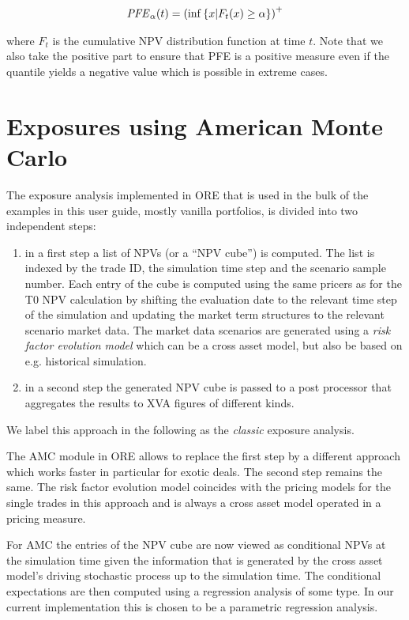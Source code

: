 \begin{align}
  \mathit{PFE}_\alpha(t) = \left(\inf\left\{ x | F_t(x) \geq \alpha\right\}\right)^+ \label{PFE}
\end{align}

where $F_t$ is the cumulative NPV distribution function at time $t$. Note that we also take the positive part to ensure
that PFE is a positive measure even if the quantile yields a negative value which is possible in extreme cases.
 
\section{Exposures using American Monte Carlo}
\label{sec:app_amc}

The exposure analysis implemented in ORE that is used in the bulk of the examples in this user guide, mostly vanilla portfolios, 
is divided into two independent steps:

\begin{enumerate}
\item in a first step a list of NPVs (or a ``NPV cube'') is computed. The list is indexed by the trade ID, the
  simulation time step and the scenario sample number. Each entry of the cube is computed using the same pricers as for
  the T0 NPV calculation by shifting the evaluation date to the relevant time step of the simulation and updating the
  market term structures to the relevant scenario market data. The market data scenarios are generated using a {\em risk
    factor evolution model} which can be a cross asset model, but also be based on e.g. historical simulation.
\item in a second step the generated NPV cube is passed to a post processor that aggregates the results to XVA figures
  of different kinds.
\end{enumerate}

We label this approach in the following as the {\em classic} exposure analysis.

The AMC module in ORE allows to replace the first step by a different approach which works faster in particular for exotic
deals. The second step remains the same. The risk factor evolution model coincides with the pricing models for the
single trades in this approach and is always a cross asset model operated in a pricing measure.

For AMC the entries of the NPV cube are now viewed as conditional NPVs at the simulation time given the information that
is generated by the cross asset model's driving stochastic process up to the simulation time. The conditional
expectations are then computed using a regression analysis of some type. In our current implementation this is chosen to
be a parametric regression analysis.

